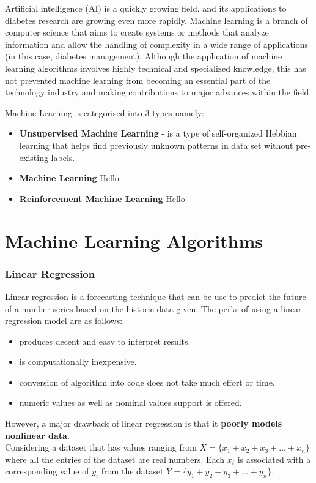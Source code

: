 \documentclass[12pt]{article}
\begin{document}
Artificial intelligence (AI) is a quickly growing field, and its applications to diabetes research are growing even more rapidly. Machine learning is a branch of computer science that aims to create systems or methods that analyze information and allow the handling of complexity in a wide range of applications (in this case, diabetes management). Although the application of machine learning algorithms involves highly technical and specialized knowledge, this has not prevented machine learning from becoming an essential part of the technology industry and making contributions to major advances within the field. 

Machine Learning is categorised into 3 types namely:
\begin{itemize}
\item \textbf{Unsupervised Machine Learning} -  is a type of self-organized Hebbian learning that helps find previously unknown patterns in data set without pre-existing labels.\cite{WIKIUML}

\item \textbf{Machine Learning} Hello

\item \textbf{Reinforcement Machine Learning} Hello
\end{itemize}

\newpage
\part{Machine Learning Algorithms}
\section{Linear Regression}
Linear regression is a forecasting technique that can be use to predict the future of a number series based on the historic data given. The perks of using a linear regression model are as follows:

\begin{itemize}
  \item produces decent and  easy to interpret results.
  \item is computationally inexpensive.
  \item conversion of algorithm into code does not take much effort or time.
  \item numeric values as well as nominal values support is offered.
\end{itemize}

However, a major drawback of linear regression is that it \textbf{poorly models nonlinear data}.
\\
Considering a dataset that has values ranging from 
$X = \lbrace x_{1}+x_{2}+x_{3}+...+x_{n} \rbrace$ where
all the entries of the dataset are real numbers. Each $x_{i}$ is associated with a corresponding value of $y_{i}$ from the dataset $Y = \lbrace y_{1}+y_{2}+y_{3}+...+y_{n} \rbrace$.
\end{document}
